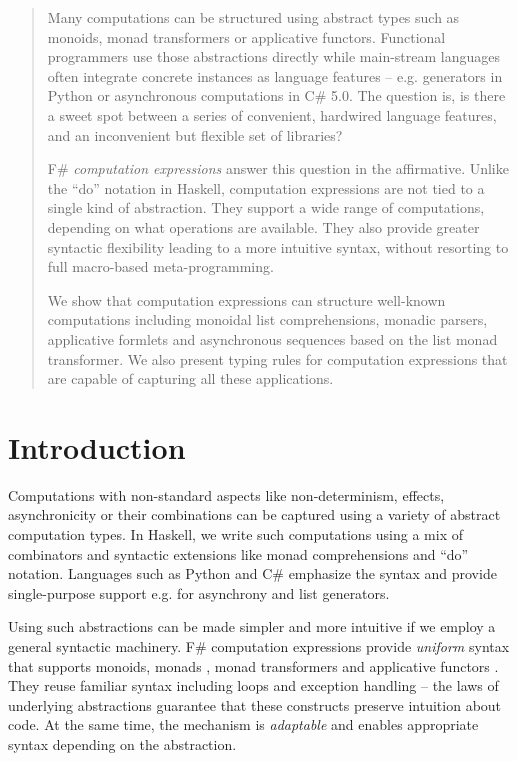 \documentclass[runningheads,a4paper]{llncs}
\begin{document}
\begin{abstract}
Many computations can be structured using abstract types such as monoids, monad transformers or 
applicative functors. Functional programmers use those abstractions directly while main-stream
languages often integrate concrete instances as language features -- e.g. generators in Python
or asynchronous computations in C\# 5.0. The question is, is there a sweet spot between a series of
convenient, hardwired language features, and an inconvenient but flexible set of libraries?

\quad F\# \emph{computation expressions} answer this question in the affirmative. Unlike 
the ``do'' notation in Haskell, computation expressions are not tied to a single kind of abstraction.
They support a wide range of computations, depending on what operations are available. They also 
provide greater syntactic flexibility leading to a more intuitive syntax, without resorting to 
full macro-based meta-programming. 

\quad We show that computation expressions can structure well-known computations including monoidal 
list comprehensions, monadic parsers, applicative formlets and asynchronous sequences based on the 
list monad transformer. We also present typing rules for computation expressions that are capable of 
capturing all these applications. 

\end{abstract}


\section{Introduction}
Computations with non-standard aspects like non-determinism, effects, asynchronicity or their
combinations can be captured using a variety of abstract computation types. In Haskell, we write 
such computations using a mix of combinators and syntactic extensions like monad comprehensions 
\cite{monad-compre} and ``do'' notation. Languages such as Python and C\# emphasize the syntax 
and provide single-purpose support e.g. for asynchrony \cite{cs-async} and list generators. 

Using such abstractions can be made simpler and more intuitive 
if we employ a general syntactic machinery. F\# computation expressions provide
\emph{uniform} syntax that supports monoids, monads \cite{monads-fp}, monad transformers 
\cite{monad-transformers} and applicative functors \cite{applicative}. They reuse familiar 
syntax including loops and exception handling -- the laws of underlying
abstractions guarantee that these constructs preserve intuition about code. At the same time, 
the mechanism is \emph{adaptable} and enables appropriate syntax depending on the abstraction.
\end{document}
